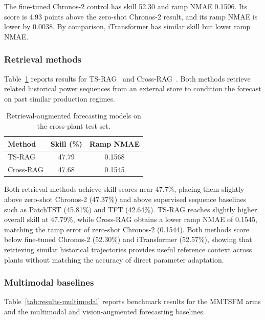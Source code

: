 The fine-tuned Chronos-2 control has skill 52.30 and ramp NMAE 0.1506. Its score is 4.93 points above the zero-shot Chronos-2 result, and its ramp NMAE is lower by 0.0038. By comparison, iTransformer has similar skill but lower ramp NMAE.

\subsubsection{Retrieval methods}

Table~\ref{tab:retrieval-native} reports results for TS-RAG~\cite{tsrag} and Cross-RAG~\cite{crossrag}. Both methods retrieve related historical power sequences from an external store to condition the forecast on past similar production regimes.

\begin{table}[htbp]\centering
\begin{tabular}{lcc}\hline
Method & Skill (\%) & Ramp NMAE \\\hline
TS-RAG & 47.79 & 0.1568 \\
Cross-RAG & 47.68 & 0.1545 \\\hline
\end{tabular}
\caption{Retrieval-augmented forecasting models on the cross-plant test set.}\label{tab:retrieval-native}
\end{table}

Both retrieval methods achieve skill scores near 47.7\%, placing them slightly above zero-shot Chronos-2 (47.37\%) and above supervised sequence baselines such as PatchTST (45.81\%) and TFT (42.64\%). TS-RAG reaches slightly higher overall skill at 47.79\%, while Cross-RAG obtains a lower ramp NMAE of 0.1545, matching the ramp error of zero-shot Chronos-2 (0.1544). Both methods score below fine-tuned Chronos-2 (52.30\%) and iTransformer (52.57\%), showing that retrieving similar historical trajectories provides useful reference context across plants without matching the accuracy of direct parameter adaptation.

\subsubsection{Multimodal baselines}

Table~\ref{tab:results-multimodal} reports benchmark results for the MMTSFM arms and the multimodal and vision-augmented forecasting baselines.

